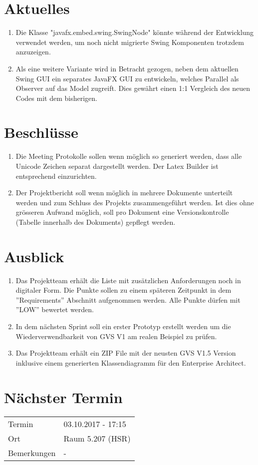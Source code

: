 \documentclass[11pt, a4paper,oneside]{scrartcl}
\begin{document}
\section{Aktuelles}
\begin{enumerate}
	\item Die Klasse "javafx.embed.swing.SwingNode" könnte während der Entwicklung verwendet werden, um noch nicht migrierte Swing Komponenten trotzdem anzuzeigen.
	\item Als eine weitere Variante wird in Betracht gezogen, neben dem aktuellen Swing GUI ein separates JavaFX GUI zu entwickeln, welches Parallel als Observer auf das Model zugreift. Dies gewährt einen 1:1 Vergleich des neuen Codes mit dem bisherigen.
\end{enumerate}

\section{Beschlüsse}
\begin{enumerate}
	\item Die Meeting Protokolle sollen wenn möglich so generiert werden, dass alle Unicode Zeichen separat dargestellt werden. Der Latex Builder ist entsprechend einzurichten. 
	\item Der Projektbericht soll wenn möglich in mehrere Dokumente unterteilt werden und zum Schluss des Projekts zusammengeführt werden. Ist dies ohne grösseren Aufwand möglich, soll pro Dokument eine Versionskontrolle (Tabelle innerhalb des Dokuments) gepflegt werden.
\end{enumerate}

\section{Ausblick}
\begin{enumerate}
	\item Das Projektteam erhält die Liste mit zusätzlichen Anforderungen noch in digitaler Form. Die Punkte sollen zu einem späteren Zeitpunkt in dem ''Requirements'' Abschnitt aufgenommen werden. Alle Punkte dürfen mit ''LOW'' bewertet werden. 
	\item In dem nächsten Sprint soll ein erster Prototyp erstellt werden um die Wiederverwendbarkeit von GVS V1 am realen Beispiel zu prüfen. 
	\item Das Projektteam erhält ein ZIP File mit der neusten GVS V1.5 Version inklusive einem generierten Klassendiagramm für den Enterprise Architect. 
\end{enumerate}

\section{Nächster Termin}
\begin{tabu} to \linewidth {l X }
	\toprule
	Termin & 03.10.2017 - 17:15 \\
	Ort & Raum 5.207 (HSR) \\
	Bemerkungen & - \\
	\bottomrule
\end{tabu}
\end{document}

